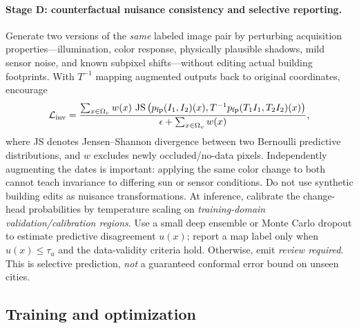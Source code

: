 \paragraph{Stage D: counterfactual nuisance consistency and selective reporting.} Generate two versions of the \emph{same} labeled image pair by perturbing acquisition properties---illumination, color response, physically plausible shadows, mild sensor noise, and known subpixel shifts---without editing actual building footprints. With $T^{-1}$ mapping augmented outputs back to original coordinates, encourage
\begin{equation}
 {\cal L}_{\rm inv}=\frac{\sum_{x\in\Omega_v}w(x)\,
  \operatorname{JS}\big(p_{\rm fp}(I_1,I_2)(x),
    T^{-1}p_{\rm fp}(T_1I_1,T_2I_2)(x)\big)}
 {\epsilon+\sum_{x\in\Omega_v}w(x)},
 \label{eq:invariance}
\end{equation}
where JS denotes Jensen--Shannon divergence between two Bernoulli predictive distributions, and $w$ excludes newly occluded/no-data pixels. Independently augmenting the dates is important: applying the same color change to both cannot teach invariance to differing sun or sensor conditions. Do not use synthetic building edits as nuisance transformations. At inference, calibrate the change-head probabilities by temperature scaling on \emph{training-domain validation/calibration regions}. Use a small deep ensemble or Monte Carlo dropout to estimate predictive disagreement $u(x)$; report a map label only when $u(x)\leq\tau_u$ and the data-validity criteria hold. Otherwise, emit \emph{review required}. This is selective prediction, \emph{not} a guaranteed conformal error bound on unseen cities.

\subsection{Training and optimization}

